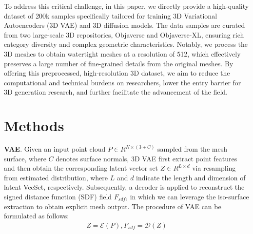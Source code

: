 \documentclass{article} %
\begin{document}
To address this critical challenge, in this paper, we directly provide a high-quality dataset of 200k samples specifically tailored for training 3D Variational Autoencoders (3D VAE) and 3D diffusion models. The data samples are curated from two large-scale 3D repositories, Objaverse and Objaverse-XL, ensuring rich category diversity and complex geometric characteristics. Notably, we process the 3D meshes to obtain watertight meshes at a resolution of 512, which effectively preserves a large number of fine-grained details from the original meshes. By offering this preprocessed, high-resolution 3D dataset, we aim to reduce the computational and technical burdens on researchers, lower the entry barrier for 3D generation research, and further facilitate the advancement of the field.


\section{Methods}



{\bf VAE}. Given an input point cloud $P \in R^{N \times (3 + C)}$ sampled from the mesh surface, where $C$ denotes surface normals, 3D VAE first extract point features and then obtain the corresponding latent vector set $Z \in R^{L \times d}$ via resampling from estimated distribution, where $L$ and $d$ indicate the length and dimension of latent VecSet, respectively. Subsequently, a decoder is applied to reconstruct the signed distance function (SDF) field $F_{sdf}$, in which we can leverage the iso-surface extraction to obtain explicit mesh output. The procedure of VAE can be formulated as follows:
\begin{align}
Z = \mathcal{E}(P), F_{sdf} = \mathcal{D}(Z)
\end{align}

\end{document}
